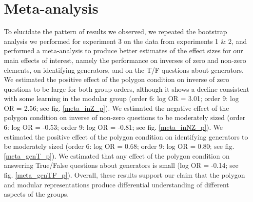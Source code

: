 \documentclass[11pt]{article}
\begin{document}
\section{Meta-analysis}
To elucidate the pattern of results we observed, we repeated the bootstrap analysis we performed for experiment 3 on the data from experiments 1 \& 2, and performed a meta-analysis to produce better estimates of the effect sizes for our main effects of interest, namely the performance on inverses of zero and non-zero elements, on identifying generators, and on the T/F questions about generators.\\[11pt]
We estimated the positive effect of the polygon condition on inverse of zero questions to be large for both group orders, although it shows a decline consistent with some learning in the modular group (order 6: log OR = 3.01; order 9: log OR = 2.56; see fig. \ref{meta_inZ_p}). We estimated the negative effect of the polygon condition on inverse of non-zero questions to be moderately sized (order 6: log OR = -0.53; order 9: log OR = -0.81; see fig. \ref{meta_inNZ_p}). We estimated the positive effect of the polygon condition on identifying generators to be moderately sized (order 6: log OR = 0.68; order 9: log OR = 0.80; see fig. \ref{meta_genT_p}). We estimated that any effect of the polygon condition on answering True/False questions about generators is small (log OR = -0.14; see fig. \ref{meta_genTF_p}). Overall, these results support our claim that the polygon and modular representations produce differential understanding of different aspects of the groups.
\end{document}
